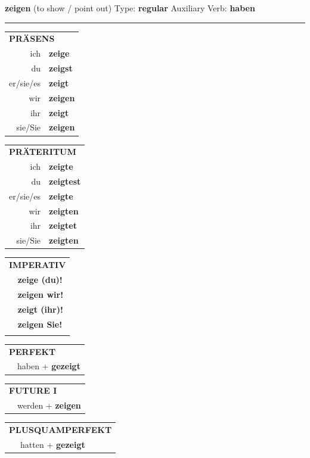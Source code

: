 \documentclass[10pt,a4paper]{revtex4-2}
\begin{document}
\begin{verbbox-acc}
    {\Large \bf zeigen} (to show / point out) \hfill Type: \textbf{regular} \hfill Auxiliary Verb: \textbf{haben} 
    
     \vspace{5pt}

    \hrule
    
    \vspace{5pt}

  \begin{tabular}{rl}
     \multicolumn{2}{l}{\textbf{PRÄSENS} }\\
    ich & \textbf{zeige}\\
    du & \textbf{zeigst}\\
    er/sie/es & \textbf{zeigt}\\
    wir & \textbf{zeigen}\\
    ihr & \textbf{zeigt}\\
    sie/Sie & \textbf{zeigen}\\
  \end{tabular}
  \hfill
  \begin{tabular}{rl}
    \multicolumn{2}{l}{\textbf{PRÄTERITUM} }\\
    ich & \textbf{zeigte}\\
    du & \textbf{zeigtest}\\
    er/sie/es & \textbf{zeigte}\\
    wir & \textbf{zeigten}\\
    ihr & \textbf{zeigtet}\\
    sie/Sie & \textbf{zeigten}\\
  \end{tabular}
  \hfill
  \begin{tabular}{rl}
     \multicolumn{2}{l}{\textbf{IMPERATIV} }\\
   & \textbf{zeige (du)!}\\
   & \textbf{zeigen wir!}\\
   & \textbf{zeigt (ihr)!}\\
   & \textbf{zeigen Sie!}\\
   & \vspace{10pt}
  \end{tabular}

 \vspace{10pt}

 \begin{tabular}{rl}
     \multicolumn{2}{l}{\textbf{PERFEKT}}\\
   & haben + \textbf{gezeigt}\\
  \end{tabular}
\hfill
\begin{tabular}{rl}
    \multicolumn{2}{l}{\textbf{FUTURE I}}\\
   & werden + \textbf{zeigen}\\
  \end{tabular}
\hfill
\begin{tabular}{rl}
    \multicolumn{2}{l}{\textbf{PLUSQUAMPERFEKT}}\\
   & hatten + \textbf{gezeigt}\\
  \end{tabular}


\end{verbbox-acc}
\end{document}
